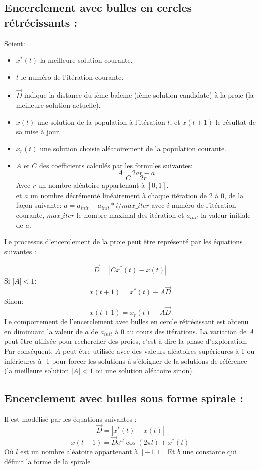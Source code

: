 \documentclass[12pt]{article}
\begin{document}
\subsection{Encerclement avec bulles en cercles rétrécissants :}
Soient:
\begin{itemize}
    \item \(x^*(t)\) la meilleure solution courante.
    \item \(t\) le numéro de l'itération courante.
    \item \(\vec{D}\) indique la distance du ième baleine (ième solution candidate) à la proie (la meilleure solution actuelle).
    \item \(x(t)\) une solution de la population à l'itération \(t\), et \(x(t+1)\) le résultat de sa mise à jour.
    \item \(x_r(t)\) une solution choisie aléatoirement de la population courante.
    \item \(A\) et \(C\) des coefficients calculés par les formules suivantes:
    \[A = 2ar-a\] 
    \[C = 2r\] 
    Avec \(r\) un nombre aléatoire appartenant à \([0,1]\).
    \\ et \(a\) un nombre décrémenté linéairement à chaque itération de 2 à 0, de la façon suivante:
    \(a =  a_{init} - a_{init}*i/max\_iter\) avec \(i\) numéro de l’itération courante, \(max\_iter\) le nombre maximal des itération et \(a_{init}\) la valeur initiale de \(a\).
\end{itemize}
Le processus d’encerclement de la proie peut être représenté par les équations suivantes :

\begin{equation*}
    \vec{D} = |Cx^*(t) - x(t)|
\end{equation*}
Si \(|A| < 1\):
\begin{equation}
    x(t+1) = x^*(t) - A\vec{D}
\end{equation}
Sinon:
\begin{equation}
    x(t+1) = x_r(t) - A\vec{D}
\end{equation}
Le comportement de l’encerclement avec bulles en cercle rétrécissant est obtenu en diminuant la valeur de \(a\) de \(a_{init}\) à 0 au cours des itérations. La variation de \(A\) peut être utilisée pour rechercher des proies, c'est-à-dire la phase d'exploration. Par conséquent, \(A\) peut être utilisée avec des valeurs aléatoires supérieures à 1 ou inférieures à -1 pour forcer les solutions à s'éloigner de la solutions de référence (la meilleure solution \(|A| < 1\) ou une solution aléatoire sinon).
\subsection{Encerclement avec bulles sous forme spirale :}
Il est modélisé par les équations suivantes :
\begin{equation}
    \vec{D} = |x^*(t) - x(t)|
\end{equation}
\begin{equation}
    x(t+1) = \vec{D} e^{bl} \cos (2\pi l) + x^*(t)
\end{equation}
Où \(l\) est un nombre aléatoire appartenant à \([-1,1]\) Et \(b\) une constante qui définit la forme de la spirale 
\end{document}
